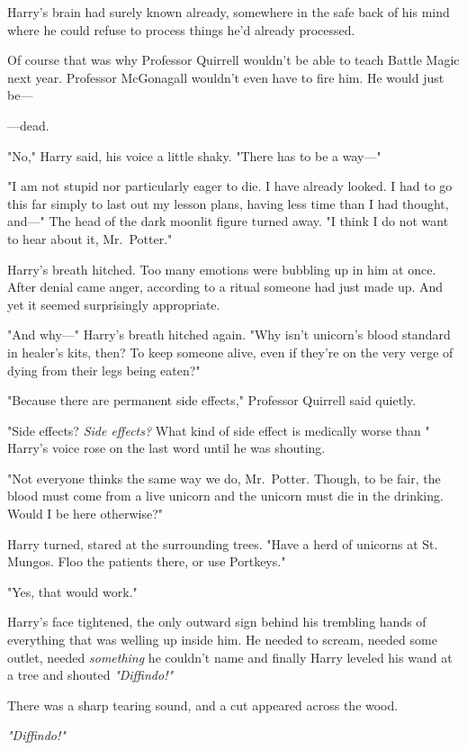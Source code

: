 Harry's brain had surely known already, somewhere in the safe back of his mind
where he could refuse to process things he'd already processed.

Of course that was why Professor Quirrell wouldn't be able to teach Battle
Magic next year. Professor McGonagall wouldn't even have to fire him. He would
just be\mbox{---}

---dead.

"No," Harry said, his voice a little shaky. "There has to be a way\mbox{---}"

"I am not stupid nor particularly eager to die. I have already looked. I had to
go this far simply to last out my lesson plans, having less time than I had
thought, and\mbox{---}" The head of the dark moonlit figure turned away. "I think I do
not want to hear about it, Mr.~Potter."

Harry's breath hitched. Too many emotions were bubbling up in him at once.
After denial came anger, according to a ritual someone had just made up. And
yet it seemed surprisingly appropriate.

"And why\mbox{---}" Harry's breath hitched again. "Why isn't unicorn's blood standard
in healer's kits, then? To keep someone alive, even if they're on the very
verge of dying from their legs being eaten?"

"Because there are permanent side effects," Professor Quirrell said quietly.

"Side effects? \emph{Side effects?} What kind of side effect is medically worse
than \emph{}" Harry's voice rose on the last word until he was shouting.

"Not everyone thinks the same way we do, Mr.~Potter. Though, to be fair, the
blood must come from a live unicorn and the unicorn must die in the drinking.
Would I be here otherwise?"

Harry turned, stared at the surrounding trees. "Have a herd of unicorns at St.
Mungos. Floo the patients there, or use Portkeys."

"Yes, that would work."

Harry's face tightened, the only outward sign behind his trembling hands of
everything that was welling up inside him. He needed to scream, needed some
outlet, needed \emph{something} he couldn't name and finally Harry leveled his
wand at a tree and shouted \emph{"Diffindo!"}

There was a sharp tearing sound, and a cut appeared across the wood.

\emph{"Diffindo!"}

